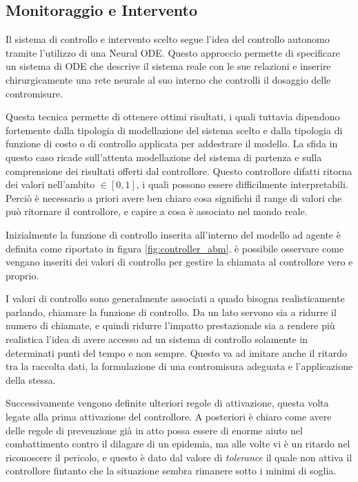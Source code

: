 \subsection{Monitoraggio e Intervento}
Il sistema di controllo e intervento scelto segue l'idea del controllo autonomo tramite l'utilizzo di 
una Neural ODE. Questo approccio permette di specificare un sistema di ODE che descrive il sistema reale 
con le sue relazioni e inserire chirurgicamente una rete neurale al suo interno che controlli il 
dosaggio delle contromisure. \cite{B_ttcher_2022} \cite{innes2019differentiable} \cite{sandoval2022neural}

Questa tecnica permette di ottenere ottimi risultati, i quali tuttavia dipendono fortemente dalla 
tipologia di modellazione del sistema scelto e dalla tipologia di funzione di costo o di controllo 
applicata per addestrare il modello. La sfida in questo caso ricade sull'attenta modellazione del 
sistema di partenza e sulla comprensione dei risultati offerti dal controllore. Questo controllore 
difatti ritorna dei valori nell'ambito $\in[0, 1]$, i quali possono essere difficilmente interpretabili.
Perciò è necessario a priori avere ben chiaro cosa significhi il range di valori che può ritornare
il controllore, e capire a cosa è associato nel mondo reale. 

Inizialmente la funzione di controllo inserita all'interno del modello ad agente è definita 
come riportato in figura \ref{fig:controller_abm}. è possibile osservare come vengano inseriti dei valori di 
controllo per gestire la chiamata al controllore vero e proprio.

I valori di controllo sono generalmente associati a quado bisogna realisticamente parlando, chiamare la 
funzione di controllo. Da un lato servono sia a ridurre il numero di chiamate, e quindi ridurre l'impatto 
prestazionale sia a rendere più realistica l'idea di avere accesso ad un sistema di controllo solamente 
in determinati punti del tempo e non sempre. Questo va ad imitare anche il ritardo tra la raccolta dati, 
la formulazione di una contromisura adeguata e l'applicazione della stessa.

Successivamente vengono definite ulteriori regole di attivazione, questa volta legate alla prima attivazione
del controllore. A posteriori è chiaro come avere delle regole di prevenzione già in atto possa essere di 
enorme aiuto nel combattimento contro il dilagare di un epidemia, ma alle volte vi è un ritardo nel riconoscere
il pericolo, e questo è dato dal valore di \emph{tolerance} il quale non attiva il controllore fintanto che 
la situazione sembra rimanere sotto i minimi di soglia. 

